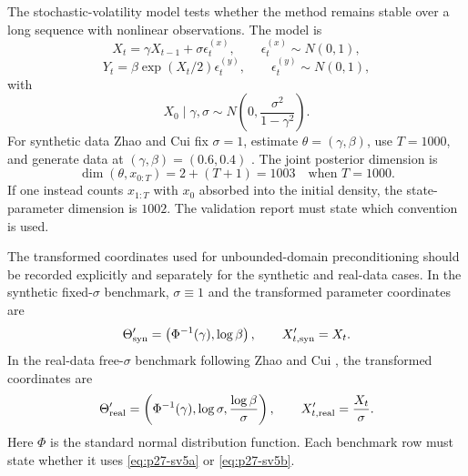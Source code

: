 \documentclass[11pt]{article}
\numberwithin{equation}{section}
\begin{document}
The stochastic-volatility model tests whether the method remains stable over a
long sequence with nonlinear observations.  The model is
\begin{equation}
    X_t=\gamma X_{t-1}+\sigma\epsilon_t^{(x)},
    \qquad
    \epsilon_t^{(x)}\sim N(0,1),
    \label{eq:p27-sv1}
\end{equation}
\begin{equation}
    Y_t
    =
    \beta\exp(X_t/2)\epsilon_t^{(y)},
    \qquad
    \epsilon_t^{(y)}\sim N(0,1),
    \label{eq:p27-sv2}
\end{equation}
with
\begin{equation}
    X_0\mid\gamma,\sigma
    \sim
    N\!\left(0,\frac{\sigma^2}{1-\gamma^2}\right).
    \label{eq:p27-sv3}
\end{equation}
For synthetic data Zhao and Cui fix \(\sigma=1\), estimate
\(\theta=(\gamma,\beta)\), use \(T=1000\), and generate data at
\((\gamma,\beta)=(0.6,0.4)\) \cite{zhao2024ttsequential}.  The joint posterior
dimension is
\begin{equation}
    \dim(\theta,x_{0:T})
    =
    2+(T+1)
    =
    1003
    \quad\text{when }T=1000.
    \label{eq:p27-sv4}
\end{equation}
If one instead counts \(x_{1:T}\) with \(x_0\) absorbed into the initial
density, the state-parameter dimension is \(1002\).  The validation report
must state which convention is used.

The transformed coordinates used for unbounded-domain preconditioning should be
recorded explicitly and separately for the synthetic and real-data cases.  In
the synthetic fixed-\(\sigma\) benchmark, \(\sigma\equiv1\) and the transformed
parameter coordinates are
\begin{equation}
    \Theta_{\rm syn}'
    =
    \left(\Phi^{-1}(\gamma),\log\beta\right),
    \qquad
    X_{t,{\rm syn}}'=X_t.
    \label{eq:p27-sv5a}
\end{equation}
In the real-data free-\(\sigma\) benchmark following Zhao and Cui
\cite{zhao2024ttsequential}, the transformed coordinates are
\begin{equation}
    \Theta_{\rm real}'
    =
    \left(\Phi^{-1}(\gamma),\log\sigma,\frac{\log\beta}{\sigma}\right),
    \qquad
    X_{t,{\rm real}}'=\frac{X_t}{\sigma}.
    \label{eq:p27-sv5b}
\end{equation}
Here \(\Phi\) is the standard normal distribution function.  Each benchmark row
must state whether it uses \eqref{eq:p27-sv5a} or \eqref{eq:p27-sv5b}.
\end{document}
